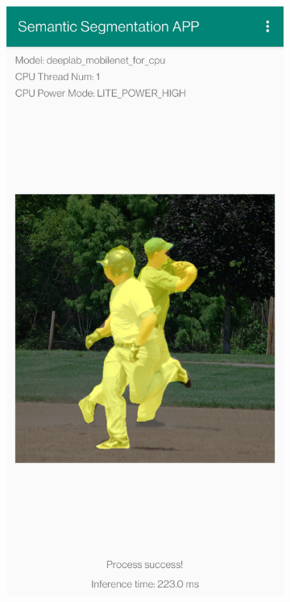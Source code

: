 \begin{figure}[htbp]
    \centering
    \begin{subfigure}[t]{0.3\linewidth}
        \includegraphics[width=1\textwidth]{figures/paddleresult.jpg}

\end{subfigure}
\end{figure}
